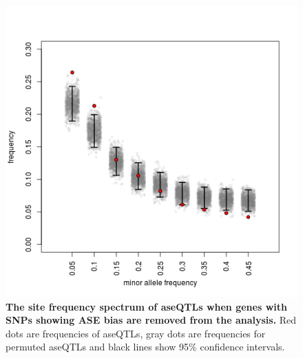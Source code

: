 \begin{figure}[h!]
      \centering
       \includegraphics[width=\linewidth]{Ch3FigS9}
    \caption{\textbf{The site frequency spectrum of aseQTLs when genes with SNPs showing ASE bias are removed from the analysis.} Red dots are frequencies of aseQTLs, gray dots are frequencies for permuted aseQTLs and black lines show 95\% confidence intervals. }
    \label{fig:3figS9}
\end{figure}

